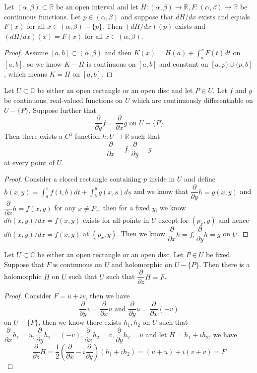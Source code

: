 \documentclass[lang=en, color=blue, ]{elegantbook}
\newcommand{\R}{\mathbb{R}}
\newcommand{\C}{\mathbb{C}}
\newcommand{\ParZ}{\dfrac{\partial}{\partial z}}
\newcommand{\ParX}{\dfrac{\partial}{\partial x}}
\newcommand{\ParY}{\dfrac{\partial}{\partial y}}
\begin{document}
\begin{lemma}
    Let $(\alpha,\beta)\subset\R$ be an open interval and let $H:(\alpha,\beta)\to\R, F:(\alpha,\beta)\to\R$ be continuous functions. Let $p\in(\alpha,\beta)$ and suppose that $dH/dx$ exists and equals $F(x)$ for all $x\in(\alpha,\beta)-\{p\}$. Then $(dH/dx)(p)$ exists and $(dH/dx)(x) = F(x)$ for all $x\in(\alpha,\beta)$.
\end{lemma}
\begin{proof}\par
    Assume $[a,b]\subset (\alpha,\beta)$ and then $K(x) = H(a) + \int_a^x F(t)dt$ on $[a,b]$, so we know $K-H$ is continuous on $[a,b]$ and constant on $[a,p)\cup(p,b]$, which means $K=H$ on $[a,b]$.
\end{proof}

\begin{theorem}
    Let $U\subset \C$ be either an open rectangle or an open disc and let $P\in U$. Let $f$ and $g$ be continuous, real-valued functions on $U$ which are continuously differentiable on $U-\{P\}$. Suppose further that
    \[\ParY f = \ParX g\text{ on }U-\{P\}\]
    Then there exists a $C^1$ function $h:U\to\R$ such that
    \[\ParX = f, \ParY = g\]
    at every point of $U$.
\end{theorem}
\begin{proof}\par
    Consider a closed rectangle containing $p$ inside in $U$ and define $h(x,y) = \int_a^x f(t,b)dt + \int_b^y g(x,s)ds$ and we know that $\ParY h = g(x,y)$ and $\ParX h = f(x,y)$ for any $x\neq P_x$, then for a fixed $y$, we know $dh(x,y)/dx= f(x,y)$ exists for all points in $U$ except for $(p_x,y)$ and hence $dh(x,y)/dx = f(x,y)$ at $(p_x,y)$. Then we know $\ParX h = f, \ParY h = g$ on $U$.
\end{proof}

\begin{theorem}
    Let $U\subset\C$ be either an open rectangle or an open disc. Let $P\in U$ be fixed. Suppose that $F$ is continuous on $U$ and holomorphic on $U-\{P\}$. Then there is a holomorphic $H$ on $U$ such that $U$ such that $\ParZ H = F$.    
\end{theorem}
\begin{proof}\par
    Consider $F = u+iv$, then we have
    \[\ParY v = \ParX u\text{ and } \ParY u = \ParX (-v)\]
    on $U-\{P\}$, then we know there exists $h_1,h_2$ on $U$ such that $\ParX h_1 = u, \ParY h_1 = (-v), \ParX h_2 = v, \ParY h_2 = u$
    and let $H = h_1 + ih_2$, we have
    \[
    \ParZ H = \dfrac{1}{2}(\ParX - i\ParY)(h_1+ih_2) = (u+u) + i(v+v) = F
    \]
\end{proof}
\end{document}
